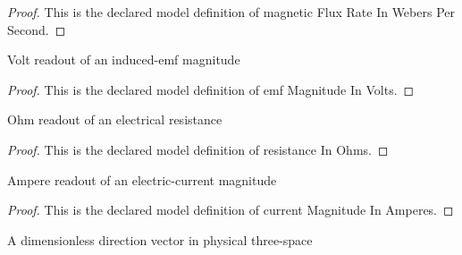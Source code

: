 \begin{proof}
  This is the declared model definition of magnetic Flux Rate In Webers Per Second.
\end{proof}
\begin{definition}
  \label{def:physics:phyx-mini-0931:phyxminiproblems-problemphyxmini0931-emfmagnitudeinvolts}
  Volt readout of an induced-emf magnitude
\end{definition}
\begin{proof}
  This is the declared model definition of emf Magnitude In Volts.
\end{proof}
\begin{definition}
  \label{def:physics:phyx-mini-0931:phyxminiproblems-problemphyxmini0931-resistanceinohms}
  Ohm readout of an electrical resistance
\end{definition}
\begin{proof}
  This is the declared model definition of resistance In Ohms.
\end{proof}
\begin{definition}
  \label{def:physics:phyx-mini-0931:phyxminiproblems-problemphyxmini0931-currentmagnitudeinamperes}
  Ampere readout of an electric-current magnitude
\end{definition}
\begin{proof}
  This is the declared model definition of current Magnitude In Amperes.
\end{proof}
\begin{definition}
  \label{def:physics:phyx-mini-0931:phyxminiproblems-problemphyxmini0931-directionvector}
  A dimensionless direction vector in physical three-space
\end{definition}
